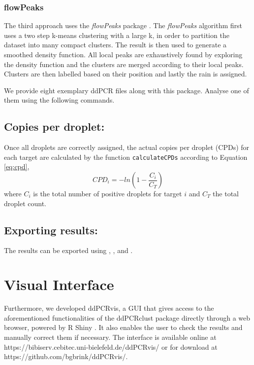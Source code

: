 \documentclass{article}
\begin{document}
\subsubsection{flowPeaks}
The third approach uses the \emph{flowPeaks} package \cite{ge2012flowpeaks}. The \emph{flowPeaks} algorithm first uses a two step k-means clustering with a large k, in order to partition the dataset into many compact clusters.
The result is then used to generate a smoothed density function.
All local peaks are exhaustively found by exploring the density function and the clusters are merged according to their local peaks.
Clusters are then labelled based on their position and lastly the rain is assigned.

We provide eight exemplary ddPCR files along with this package. Analyse one of them using the following commands.
\begin{Schunk}
\end{Schunk}


\subsection{Copies per droplet:}
Once all droplets are correctly assigned, the actual copies per droplet (CPDs) for each target are calculated by the function \texttt{calculateCPDs} according to Equation \ref{eq:cpd},
\begin{equation}\label{eq:cpd}
CPD_i = -ln(1-\frac{C_i}{C_T})
\end{equation}
where $C_i$ is the total number of positive droplets for target $i$ and $C_T$ the total droplet count.

\subsection{Exporting results:}
The results can be exported using , , and .

\section{Visual Interface}
Furthermore, we developed ddPCRvis, a GUI that gives access to the aforementioned functionalities of the ddPCRclust package directly through a web browser, powered by R Shiny \cite{shiny2017}.
It also enables the user to check the results and manually correct them if necessary. The interface is available online at https://bibiserv.cebitec.uni-bielefeld.de/ddPCRvis/ or for download at https://github.com/bgbrink/ddPCRvis/.


\end{document}
